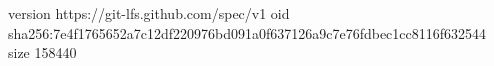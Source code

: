 version https://git-lfs.github.com/spec/v1
oid sha256:7e4f1765652a7c12df220976bd091a0f637126a9c7e76fdbec1cc8116f632544
size 158440
